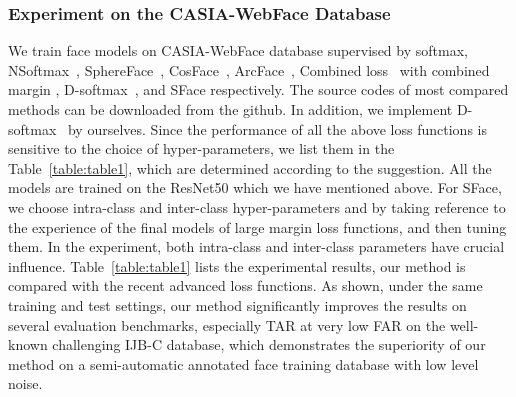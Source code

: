 \documentclass[journal,comsoc]{IEEEtran}
\begin{document}
\subsubsection{Experiment on the CASIA-WebFace Database}
We train face models on CASIA-WebFace database supervised by softmax, NSoftmax~\cite{wang2017normface}, SphereFace~\cite{Liu2017SphereFace}, CosFace~\cite{Wang2018CosFace}, ArcFace~\cite{deng2019arcface}, Combined loss~\cite{deng2019arcface} with combined margin , D-softmax~\cite{he2019softmax}, and SFace respectively. The source codes of most compared methods can be downloaded from the github. In addition, we implement D-softmax~\cite{he2019softmax} by ourselves. Since the performance of all the above loss functions is sensitive to the choice of hyper-parameters, we list them in the Table~\ref{table:table1}, which are determined according to the suggestion. All the models are trained on the ResNet50 which we have mentioned above. For SFace, we choose intra-class and inter-class hyper-parameters  and  by taking reference to the experience of the final models of large margin loss functions, and then tuning them. In the experiment, both intra-class and inter-class parameters have crucial influence. Table~\ref{table:table1} lists the experimental results, our method is compared with the recent advanced loss functions. As shown, under the same training and test settings, our method significantly improves the results on several evaluation benchmarks, especially TAR at very low FAR on the well-known challenging IJB-C database, which demonstrates the superiority of our method on a semi-automatic annotated face training database with low level noise. 
\end{document}
